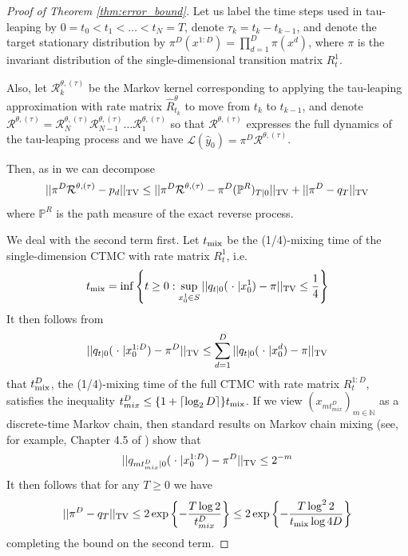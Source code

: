\documentclass{article}
\begin{document}
\begin{proof}[Proof of Theorem \ref{thm:error_bound}]
Let us label the time steps used in tau-leaping by $0 = t_0 < t_1 < \dots < t_N = T$, denote $\tau_k = t_{k} - t_{k-1}$, and denote the target stationary distribution by $\pi^D(x^{1:D}) = \prod_{d=1}^D \pi(x^d)$, where $\pi$ is the invariant distribution of the single-dimensional transition matrix $R^1_t$.

Also, let $\mathcal{R}^{\theta, (\tau)}_k$ be the Markov kernel corresponding to applying the tau-leaping approximation with rate matrix $\hat R^\theta_{t_k}$ to move from $t_k$ to $t_{k-1}$, and denote $\mathcal{R}^{\theta, (\tau)} = \mathcal{R}^{\theta, (\tau)}_N \mathcal{R}^{\theta, (\tau)}_{N-1} \dots \mathcal{R}^{\theta, (\tau)}_1$ so that $\mathcal{R}^{\theta, (\tau)}$ expresses the full dynamics of the tau-leaping process and we have $\mathcal{L}(\hat y_0) = \pi^D \mathcal{R}^{\theta, (\tau)}$.

Then, as in \cite{de2021diffusion} we can decompose
\begin{equation}
    ||\pi^D \mathcal{R}^{\theta, (\tau)} - p_d||_{\textup{TV}} \leq ||\pi^D \mathcal{R}^{\theta, (\tau)} - \pi^D (\mathbb{P}^R)_{T|0}||_{\textup{TV}} + ||\pi^D - q_T||_{\textup{TV}}
\end{equation}
where $\mathbb{P}^R$ is the path measure of the exact reverse process.

We deal with the second term first. Let $t_{\textup{mix}}$ be the (1/4)-mixing time of the single-dimension CTMC with rate matrix $R^1_t$, i.e.
\begin{equation}
    t_{\textup{mix}} = \inf \left \{t \geq 0 : \sup_{x_0^1 \in S} ||q_{t|0}(\; \cdot \;| x_0^1) - \pi||_{\textup{TV}} \leq \frac{1}{4} \right \}
\end{equation}
It then follows from
\begin{equation}
    ||q_{t|0}(\; \cdot \; |  x_0^{1:D}) - \pi^D||_{\textup{TV}} \leq \sum_{d=1}^D ||q_{t|0}(\; \cdot \;| x_0^d) - \pi||_{\textup{TV}}
\end{equation}
that $t_{\textup{mix}}^D$, the (1/4)-mixing time of the full CTMC with rate matrix $R^{1:D}_t$, satisfies the inequality $t^D_{mix} \leq \{1+ \lceil \log_2 D \rceil \}t_{\textup{mix}}$. If we view $(x_{m t^D_{mix}})_{m \in \mathbb{N}}$ as a discrete-time Markov chain, then standard results on Markov chain mixing (see, for example, Chapter 4.5 of \cite{levin2009markovchains}) show that
\begin{equation}
    ||q_{mt^D_{mix} | 0}(\; \cdot \; | x_0^{1:D}) - \pi^D||_{\textup{TV}} \leq 2^{-m}
\end{equation}
It then follows that for any $T \geq 0$ we have
\begin{equation}
    ||\pi^D - q_T||_{\textup{TV}} \leq 2 \exp \left\{ - \frac{T \log 2}{t^D_{mix}} \right\} \leq 2 \exp \left \{ - \frac{T \log^2 2}{t_{\textup{mix}} \log 4D} \right \}
\end{equation}
completing the bound on the second term.


\end{proof}
\end{document}
